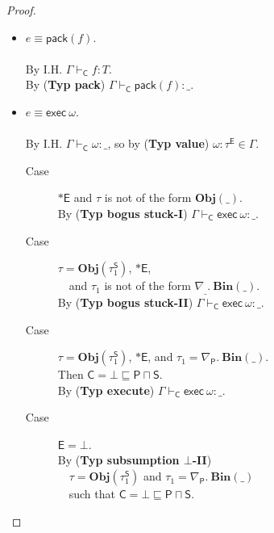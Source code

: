 \documentclass{sigplanconf}
\newcommand{\labp}{\mathsf P}
\newcommand{\labb}{\mathsf S}
\newcommand{\labt}{\mathsf E}
\newcommand{\labc}{\mathsf C}
\newcommand{\trule}[1]{(\textbf{Typ #1})}
\begin{document}
\begin{proof}
\begin{itemize}
$ $
\item $e \equiv \mathsf{pack}(f)$.\\
\\
By I.H. $\Gamma \vdash_{\labc} f : T$.\\
By \trule{pack} $\Gamma \vdash_{\labc} \mathsf{pack}(f) : \_$.\\
\item $e \equiv \mathsf{exec}~\omega$.\\
\\
By I.H. $\Gamma \vdash_{\labc} \omega : \_$, so by \trule{value} $\omega : \tau^{\labt} \in \Gamma$.
\begin{description}
\item[Case] $\ast \labt$ and $\tau$ is not of the form $\mathbf{Obj}(\_)$.\\
By \trule{bogus stuck-I} $\Gamma \vdash_{\labc} \mathsf{exec}~\omega : \_$.
\item[Case] $\tau = \mathbf{Obj}(\tau_1^{\labb})$, $\ast \labt$, \\
$~~~$ and $\tau_1$ is not of the form $\nabla_\_.~\mathbf{Bin}(\_)$.\\
By \trule{bogus stuck-II} $\Gamma \vdash_{\labc} \mathsf{exec}~\omega : \_$.
\item[Case] $\tau = \mathbf{Obj}(\tau_1^{\labb})$, $\ast \labt$, and $\tau_1 = \nabla_{\labp}.~\mathbf{Bin}(\_)$.\\
Then $\labc = \bot \sqsubseteq \labp \sqcap \labb$.\\
By \trule{execute} $\Gamma \vdash_{\labc} \mathsf{exec}~\omega : \_$.
\item[Case] $\labt = \bot$.\\
By \trule{subsumption $\bot$-II} \\
$~~~$ $\tau = \mathbf{Obj}(\tau_1^{\labb})$ and $\tau_1 = \nabla_{\labp}.~\mathbf{Bin}(\_)$\\
$~~~$ such that $\labc = \bot \sqsubseteq \labp \sqcap \labb$.\\

\end{description}
\end{itemize}
\end{proof}
\end{document}
